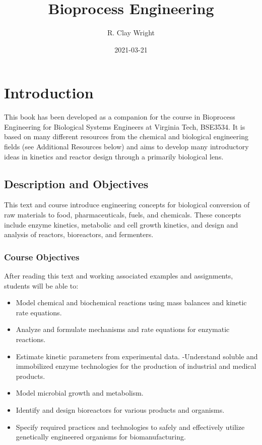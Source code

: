 \documentclass[
]{article}
\title{Bioprocess Engineering}
\author{R. Clay Wright}
\date{2021-03-21}
\providecommand{\tightlist}{%
  \setlength{\itemsep}{0pt}\setlength{\parskip}{0pt}}
\begin{document}
\maketitle

{
\setcounter{tocdepth}{3}
\tableofcontents
}
\hypertarget{introduction}{%
\section{Introduction}\label{introduction}}

This book has been developed as a companion for the course in Bioprocess Engineering for Biological Systems Engineers at Virginia Tech, BSE3534. It is based on many different resources from the chemical and biological engineering fields (see Additional Resources below) and aims to develop many introductory ideas in kinetics and reactor design through a primarily biological lens.

\hypertarget{description-and-objectives}{%
\subsection{Description and Objectives}\label{description-and-objectives}}

This text and course introduce engineering concepts for biological conversion of raw materials to food, pharmaceuticals, fuels, and chemicals. These concepts include enzyme kinetics, metabolic and cell growth kinetics, and design and analysis of reactors, bioreactors, and fermenters.

\hypertarget{course-objectives}{%
\subsubsection{Course Objectives}\label{course-objectives}}

After reading this text and working associated examples and assignments, students will be able to:

\begin{itemize}
\tightlist
\item
  Model chemical and biochemical reactions using mass balances and kinetic rate equations.
\item
  Analyze and formulate mechanisms and rate equations for enzymatic reactions.
\item
  Estimate kinetic parameters from experimental data.
  -Understand soluble and immobilized enzyme technologies for the production of industrial and medical products.
\item
  Model microbial growth and metabolism.
\item
  Identify and design bioreactors for various products and organisms.
\item
  Specify required practices and technologies to safely and effectively utilize genetically engineered organisms for biomanufacturing.
\end{itemize}
\end{document}
